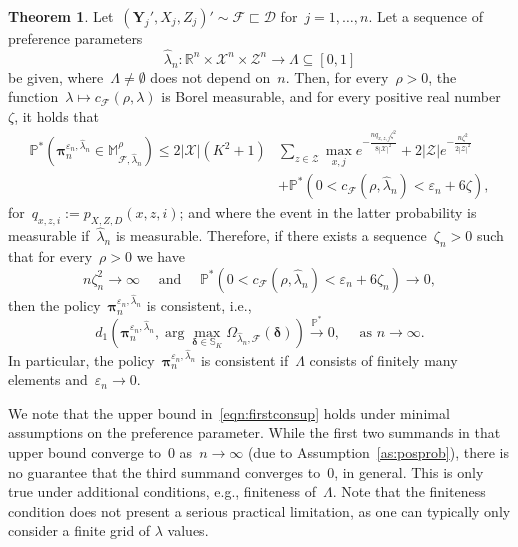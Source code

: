 \documentclass[11pt, a4paper]{article}
\newcommand{\R}{\mathbb{R}}
\newcommand{\cps}{\xrightarrow{\mathbb{P}^*}}
\theoremstyle{definition}
\newtheorem{theorem}{Theorem}[section]
\begin{document}
\begin{theorem}\label{thm:consi}
Let~$(\bm{Y}_j', X_j, Z_j)' \sim \mathcal{F} \sqsubset \mathscr{D}$ for~$j =1, \hdots, n$. Let a sequence of preference parameters~$$\hat{\lambda}_n: \R^n \times \mathcal{X}^n \times \mathcal{Z}^n \to \Lambda \subseteq [0, 1]$$ be given, where~$\Lambda \neq \emptyset$ does not depend on~$n$. Then, for every~$\rho > 0$, the function~$\lambda \mapsto c_{\mathcal{F}}(\rho, \lambda)$ is Borel measurable, and for every positive real number~$\zeta$, it holds that
%
\begin{equation}
\begin{aligned}\label{eqn:firstconsup}
\mathbb{P}^* \left( \bm{\pi}_{n}^{\varepsilon_n, \hat{\lambda}_{n}}  \in \mathbb{M}_{\mathcal{F},  \hat{\lambda}_{n}}^{\rho}\right) 
\leq 2 |\mathcal{X}|
\left(K^2 + 1\right) & \sum_{z \in \mathcal{Z}} \max_{x, j}  e^{-\frac{nq_{x,z,j} \zeta^2}{8 |\mathcal{X}|^2 }} + 2 |\mathcal{Z}| e^{-\frac{n\zeta^2}{2 |\mathcal{Z}|^2}} \\
& + \mathbb{P}^*\left( 0 <   c_{\mathcal{F}}(\rho, \hat{\lambda}_n) <\varepsilon_n + 6 \zeta  \right),
\end{aligned}
\end{equation}
%
for~$q_{x,z,i} := p_{X, Z, D}(x, z, i)$; and where the event in the latter probability is measurable if~$\hat{\lambda}_n$ is measurable. Therefore, if there exists a sequence~$\zeta_n > 0$ such that for every~$\rho > 0$ we have~$$n\zeta_n^2 \to \infty \quad \text{ and }  \quad \mathbb{P}^*\left( 0 <   c_{\mathcal{F}}(\rho, \hat{\lambda}_n) <\varepsilon_n + 6 \zeta_n \right) \to 0,$$ then the policy~$\bm{\pi}_{n}^{\varepsilon_n, \hat{\lambda}_{n}}$ is consistent, i.e.,
%
\begin{equation}\label{eqn:conspro}
d_1\left(\bm{\pi}_{n}^{\varepsilon_n, \hat{\lambda}_{n}}, \arg \max_{\bm{\delta}\in\mathbb{S}_K} \Omega_{  \hat{\lambda}_{n}, \mathcal{F}}(\bm{\delta})\right) \cps 0, \quad \text{ as } n \to \infty.
\end{equation}
%
In particular, the policy~$\bm{\pi}_{n}^{\varepsilon_n, \hat{\lambda}_{n}}$ is consistent if~$\Lambda$ consists of finitely many elements and~$\varepsilon_n \to 0$.
\end{theorem}
%
We note that the upper bound in~\eqref{eqn:firstconsup} holds under minimal assumptions on the preference parameter. While the first two summands in that upper bound converge to~$0$ as~$n \to \infty$ (due to Assumption~\ref{as:posprob}), there is no guarantee that the third summand converges to~$0$, in general. This is only true under additional conditions, e.g., finiteness of~$\Lambda$. Note that the finiteness condition does not present a serious practical limitation, as one can typically only consider a finite grid of $\lambda$ values.
\end{document}
